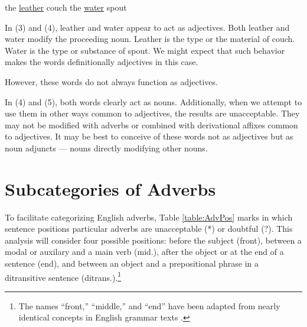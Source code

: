 \documentclass[doc,12pt,natbib]{apa6}
\begin{document}
\begin{exe}
	\ex the \underline{leather} couch
	\ex the \underline{water} spout
\end{exe}

In (3) and (4), leather and water appear to act as adjectives. Both leather and
water modify the proceeding noun. Leather is the type or the material of couch.
Water is the type or substance of spout. We might expect that such behavior
makes the words definitionally adjectives in this case.

However, these words do not always function as adjectives.
\begin{exe}
\end{exe}
In (4) and (5), both words clearly act as nouns. Additionally, when we attempt
to use them in other ways common to adjectives, the results are unacceptable.
They may not be modified with adverbs or combined with derivational affixes
common to adjectives.  It may be best to conceive of these words not as
adjectives but as noun adjuncts --- nouns directly modifying other nouns.

\section{Subcategories of Adverbs}

To facilitate categorizing English adverbs, Table \ref{table:AdvPos} marks in
which sentence positions particular adverbs are unacceptable (*) or doubtful
(?). This analysis will consider four possible positions: before the subject
(front), between a modal or auxilary and a main verb (mid.), after the object
or at the end of a sentence (end), and between an object and a prepositional
phrase in a ditransitive sentence (ditrans.).\footnote{The names ``front,''
	``middle,'' and ``end'' have been adapted from nearly identical concepts in
	English grammar texts \citep{AdverbPlacement}.}
\end{document}
